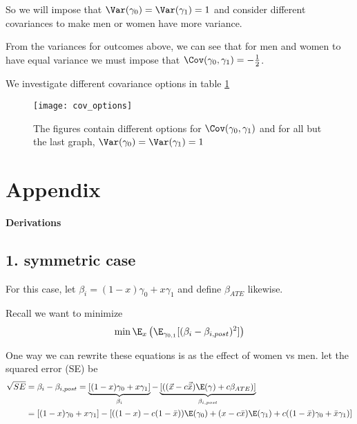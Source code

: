 So we will impose that $\Var(\gamma_0) = \Var(\gamma_1) = 1$ and consider different covariances to make men or women have more variance.

From the variances for outcomes above, we can see that for men and women to have equal variance we must impose that  $\Cov(\gamma_0, \gamma_1) = -\frac{1}{2}$.

We investigate different covariance options in table \ref{fig:cov_options}

\begin{figure}[btp]
	\label{fig:cov_options}
	\centering
	\texttt{[image: cov\_options]}
	\caption{The figures contain different options for $\Cov(\gamma_0, \gamma_1)$ and for all but the last graph, $\Var(\gamma_0) = \Var(\gamma_1) = 1$} 
\end{figure}


\section{Appendix}

\begin{center}
	{\large \bf Derivations }
\end{center}

\subsection*{1. symmetric case}

For this case, let $\beta_i = (1 - x) \gamma_0 + x \gamma_1$ and define $\beta_{ATE}$ likewise.

Recall we want to minimize
\begin{align*}
\min \E_x \left(\E_{\gamma_{0,1}}[(\beta_i - \beta_{i,post})^2]\right)
\end{align*}

One way we can rewrite these equations is as the effect of women vs men.
let the squared error (SE) be
\begin{align*}
	\sqrt{SE} &= \beta_i -  \beta_{i,post} = \underbrace{[(1-x) \gamma_0 + x \gamma_1]}_{\text{$\beta_i$}}  - \underbrace{[((\vec{x} - c \vec{\bar{x}})\E(\gamma) + c \beta_{ATE})]}_\text{$\beta_{i,post}$} \\
	  &= [(1-x) \gamma_0 + x \gamma_1]  - [((1-x) - c (1 - \bar{x})) \E(\gamma_0) + (x - c \bar{x})\E(\gamma_1) + c((1-\bar{x}) \gamma_0 + \bar{x} \gamma_1)] \\
\end{align*}

